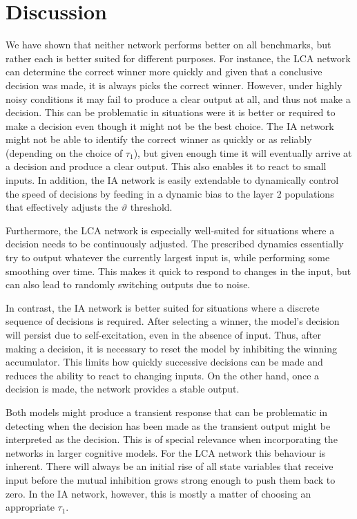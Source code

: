 \documentclass[10pt,letterpaper]{article}
\begin{document}
\section{Discussion}
We have shown that neither network performs better on all benchmarks, but rather each is better suited for different purposes.
For instance, the LCA network can determine the correct winner more quickly and given that a conclusive decision was made, it is always picks the correct winner.
However, under highly noisy conditions it may fail to produce a clear output at all, and thus not make a decision.
This can be problematic in situations were it is better or required to make a decision even though it might not be the best choice.
The IA network might not be able to identify the correct winner as quickly or as reliably (depending on the choice of $\tau_1$), but given enough time it will eventually arrive at a decision and produce a clear output.
This also enables it to react to small inputs.
In addition, the IA network is easily extendable to dynamically control the speed of decisions by feeding in a dynamic bias to the layer 2 populations that effectively adjusts the $\vartheta$ threshold.

Furthermore, the LCA network is especially well-suited for situations where a decision needs to be continuously adjusted.
The prescribed dynamics essentially try to output whatever the currently largest input is, while performing some smoothing over time.
This makes it quick to respond to changes in the input, but can also lead to randomly switching outputs due to noise.

In contrast, the IA network is better suited for situations where a discrete sequence of decisions is required.
After selecting a winner, the model's decision will persist due to self-excitation, even in the absence of input.
Thus, after making a decision, it is necessary to reset the model by inhibiting the winning accumulator.
This limits how quickly successive decisions can be made and reduces the ability to react to changing inputs.
On the other hand, once a decision is made, the network provides a stable output.

Both models might produce a transient response that can be problematic in detecting when the decision has been made as the transient output might be interpreted as the decision.
This is of special relevance when incorporating the networks in larger cognitive models.
For the LCA network this behaviour is inherent.
There will always be an initial rise of all state variables that receive input before the mutual inhibition grows strong enough to push them back to zero.
In the IA network, however, this is mostly a matter of choosing an appropriate $\tau_1$.
\end{document}
